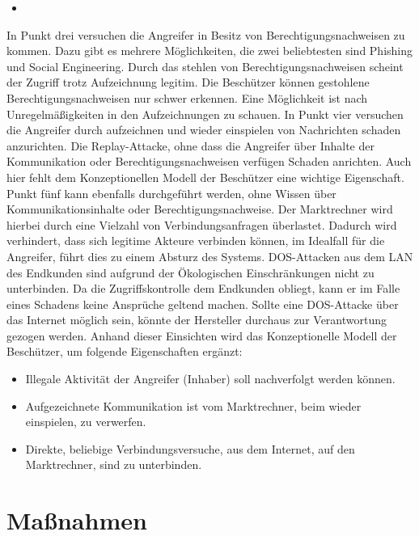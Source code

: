 \documentclass[11pt,a4paper]{report}
\begin{document}
\begin{itemize}[leftmargin=*]
\item 
\end{itemize}

In Punkt drei versuchen die Angreifer in Besitz von Berechtigungsnachweisen zu kommen. Dazu gibt es mehrere Möglichkeiten, die zwei beliebtesten sind Phishing und Social Engineering. Durch das stehlen von Berechtigungsnachweisen scheint der Zugriff trotz Aufzeichnung legitim. Die Beschützer können gestohlene Berechtigungsnachweisen nur schwer erkennen. Eine Möglichkeit ist nach Unregelmäßigkeiten in den Aufzeichnungen zu schauen. In Punkt vier versuchen die Angreifer durch aufzeichnen und wieder einspielen von Nachrichten schaden anzurichten. Die Replay-Attacke, ohne dass die Angreifer über Inhalte der Kommunikation oder Berechtigungsnachweisen verfügen Schaden anrichten. Auch hier fehlt dem Konzeptionellen Modell der Beschützer eine wichtige Eigenschaft. Punkt fünf kann ebenfalls durchgeführt werden, ohne Wissen über Kommunikationsinhalte oder Berechtigungsnachweise. Der Marktrechner wird hierbei durch eine Vielzahl von Verbindungsanfragen überlastet. Dadurch wird verhindert, dass sich legitime Akteure verbinden können, im Idealfall für die Angreifer, führt dies zu einem Absturz des Systems. DOS-Attacken aus dem LAN des Endkunden sind aufgrund der Ökologischen Einschränkungen nicht zu unterbinden. Da die Zugriffskontrolle dem Endkunden obliegt, kann er im Falle eines Schadens keine Ansprüche geltend machen. Sollte eine DOS-Attacke über das Internet möglich sein, könnte der Hersteller durchaus zur Verantwortung gezogen werden. Anhand dieser Einsichten wird das Konzeptionelle Modell der Beschützer, um folgende Eigenschaften ergänzt:

\begin{itemize}[leftmargin=*]
\item Illegale Aktivität der Angreifer (Inhaber) soll nachverfolgt werden können.
\item Aufgezeichnete Kommunikation ist vom Marktrechner, beim wieder einspielen, zu verwerfen.
\item Direkte, beliebige Verbindungsversuche, aus dem Internet, auf den Marktrechner, sind zu unterbinden.
\end{itemize}

\section{Maßnahmen} \label{sec:analysis_measures}
\end{document}
